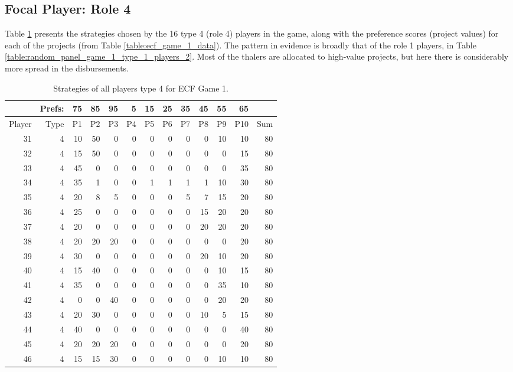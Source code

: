 \documentclass[11pt, oneside]{article}   	%
\begin{document}
\newpage\clearpage
\subsection{Focal Player: Role 4}

Table \ref{table:random_panel_game_1_type_4_players} presents the strategies chosen by the
16 type 4 (role 4) players in the game, along with  the preference scores (project values) for each of the projects (from Table \ref{table:ecf_game_1_data}). The pattern in evidence is broadly that of the role 1 players, in Table \ref{table:random_panel_game_1_type_1_players_2}. Most of the thalers are allocated to high-value projects, but here there is considerably more spread in the disbursements.


 \begin{table}[h]
 \figtop
 
 \centering
\begin{tabular}{rrrrrrrrrrrrr}
& Prefs: & 75 & 85 & 95 & 5 & 15 & 25 & 35 & 45 & 55 & 65 & \\ \hline
Player & Type & P1 & P2 & P3 & P4 & P5 & P6 & P7 & P8 & P9 & P10 & Sum \\ \hline
31 & 4 & 10 & 50 & 0 & 0 & 0 & 0 & 0 & 0 & 10 & 10 & 80 \\ 
32 & 4 & 15 & 50 & 0 & 0 & 0 & 0 & 0 & 0 & 0 & 15 & 80 \\ 
33 & 4 & 45 & 0 & 0 & 0 & 0 & 0 & 0 & 0 & 0 & 35 & 80 \\ 
34 & 4 & 35 & 1 & 0 & 0 & 1 & 1 & 1 & 1 & 10 & 30 & 80 \\ 
35 & 4 & 20 & 8 & 5 & 0 & 0 & 0 & 5 & 7 & 15 & 20 & 80 \\ 
36 & 4 & 25 & 0 & 0 & 0 & 0 & 0 & 0 & 15 & 20 & 20 & 80 \\ 
37 & 4 & 20 & 0 & 0 & 0 & 0 & 0 & 0 & 20 & 20 & 20 & 80 \\ 
38 & 4 & 20 & 20 & 20 & 0 & 0 & 0 & 0 & 0 & 0 & 20 & 80 \\ 
39 & 4 & 30 & 0 & 0 & 0 & 0 & 0 & 0 & 20 & 10 & 20 & 80 \\ 
40 & 4 & 15 & 40 & 0 & 0 & 0 & 0 & 0 & 0 & 10 & 15 & 80 \\ 
41 & 4 & 35 & 0 & 0 & 0 & 0 & 0 & 0 & 0 & 35 & 10 & 80 \\ 
42 & 4 & 0 & 0 & 40 & 0 & 0 & 0 & 0 & 0 & 20 & 20 & 80 \\ 
43 & 4 & 20 & 30 & 0 & 0 & 0 & 0 & 0 & 10 & 5 & 15 & 80 \\ 
44 & 4 & 40 & 0 & 0 & 0 & 0 & 0 & 0 & 0 & 0 & 40 & 80 \\ 
45 & 4 & 20 & 20 & 20 & 0 & 0 & 0 & 0 & 0 & 0 & 20 & 80 \\ 
46 & 4 & 15 & 15 & 30 & 0 & 0 & 0 & 0 & 0 & 10 & 10 & 80 \\ 
\end{tabular}
 \caption{Strategies of all players type 4 for ECF Game 1.}
 \label{table:random_panel_game_1_type_4_players}
 \figbot
\end{table}
\end{document}
